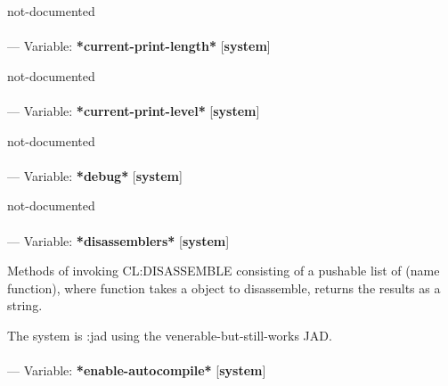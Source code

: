\begin{adjustwidth}{5em}{5em}
not-documented
\end{adjustwidth}

\paragraph{}
\label{SYSTEM:*CURRENT-PRINT-LENGTH*}
--- Variable: \textbf{*current-print-length*} [\textbf{system}] \textit{}

\begin{adjustwidth}{5em}{5em}
not-documented
\end{adjustwidth}

\paragraph{}
\label{SYSTEM:*CURRENT-PRINT-LEVEL*}
--- Variable: \textbf{*current-print-level*} [\textbf{system}] \textit{}

\begin{adjustwidth}{5em}{5em}
not-documented
\end{adjustwidth}

\paragraph{}
\label{SYSTEM:*DEBUG*}
--- Variable: \textbf{*debug*} [\textbf{system}] \textit{}

\begin{adjustwidth}{5em}{5em}
not-documented
\end{adjustwidth}

\paragraph{}
\label{SYSTEM:*DISASSEMBLERS*}
--- Variable: \textbf{*disassemblers*} [\textbf{system}] \textit{}

\begin{adjustwidth}{5em}{5em}
Methods of invoking CL:DISASSEMBLE consisting of a pushable list of (name function), where function takes a object to disassemble, returns the results as a string.

The system is :jad using the venerable-but-still-works JAD. 

\end{adjustwidth}

\paragraph{}
\label{SYSTEM:*ENABLE-AUTOCOMPILE*}
--- Variable: \textbf{*enable-autocompile*} [\textbf{system}] \textit{}

